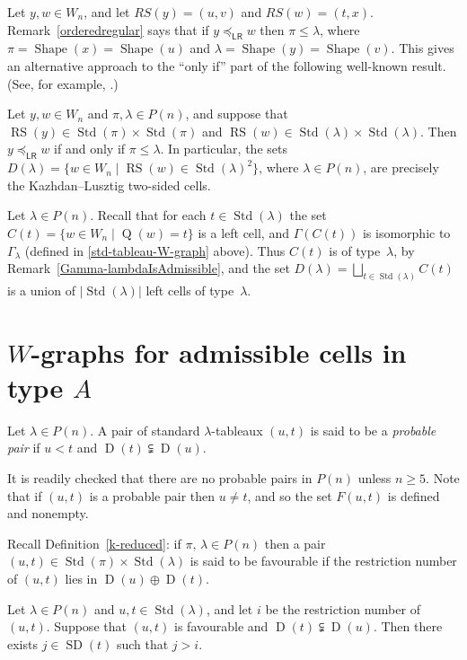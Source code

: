 \documentclass[ALCO,ThmDefs,Unicode,epreuves]{cedram}
\newcommand{\leftright}{_{\mathsf{LR}}}
\DeclareMathOperator{\STD}{Std}
\DeclareMathOperator{\shape}{Shape}
\DeclareMathOperator{\SD}{SD}
\DeclareMathOperator{\D}{D}
\DeclareMathOperator{\RS}{RS}
\DeclareMathOperator{\RSQ}{Q}
\begin{document}
\begin{rema}\label{orderedtwosided}
Let $y,w \in W_n$, and let $RS(y)=(u,v)$ and $RS(w)=(t,x)$. Remark~\ref{orderedregular}
says that if $y\preceq\leftright w$ then
$\pi\leqslant\lambda$, where $\pi=\shape(x)=\shape(u)$ and
$\lambda=\shape(y)=\shape(v)$. This gives an alternative approach to
the ``only if'' part of the following well-known result. (See, for example,
\cite[Theorem~5.1]{geck:klMurphy}.)
\begin{theo}\label{Wn-two-sidedcell}
Let $y,w\in W_n$ and $\pi,\lambda\in P(n)$, and suppose that $\RS(y)\in\STD(\pi)\times\STD(\pi)$ and
$\RS(w)\in\STD(\lambda)\times\STD(\lambda)$. Then
$y\preceq\leftright w$ if and only if $\pi\leqslant\lambda$. In particular,
the sets $D(\lambda)=\{w\in W_n \mid \RS(w)\in\STD(\lambda)^2\}$, where
$\lambda\in P(n)$, are precisely the Kazhdan--Lusztig two-sided cells.
\end{theo}
Let $\lambda\in P(n)$. Recall that for each $t\in\STD(\lambda)$ the set
$C(t)=\{w\in W_n\mid \RSQ(w)=t\}$ is a left cell, and $\Gamma(C(t))$ is
isomorphic to $\Gamma_{\lambda}$ (defined in \ref{std-tableau-W-graph} above).
Thus $C(t)$ is of type~$\lambda$, by Remark~\ref{Gamma-lambdaIsAdmissible},
and the set $D(\lambda)=\bigsqcup_{t\in\STD(\lambda)}C(t)$
is a union of $\lvert \STD(\lambda) \rvert$
left cells of type~$\lambda$.
\end{rema}

\section{\texorpdfstring{$W$}{W}-graphs for admissible cells in type \texorpdfstring{$A$}{A}}
\label{sec:9}

\begin{defi}\label{probablepair}
Let $\lambda\in P(n)$. A pair of standard $\lambda$-tableaux $(u,t)$ is said to
be a \emph{probable pair} if $u<t$ and $\D(t)\subsetneqq\D(u)$.
\end{defi}
It is readily checked that there are no probable pairs in $P(n)$ unless $n\geqslant 5$.
Note that if $(u,t)$ is a probable pair then $u\ne t$, and so the set
$F(u,t)$ is defined and nonempty.

Recall Definition~\ref{k-reduced}: if $\pi,\,\lambda\in P(n)$ then a pair
$(u,t)\in\STD(\pi)\times\STD(\lambda)$ is said to be favourable if the restriction number
of $(u,t)$ lies in $\D(u)\oplus\D(t)$.
\begin{lemm}\label{rnltmaxsd}
Let $\lambda\in P(n)$ and $u,t\in\STD(\lambda)$, and let $i$ be the
restriction number of~$(u,t)$. Suppose that $(u,t)$ is favourable and
$\D(t)\subsetneqq\D(u)$. Then there exists $j\in \SD(t)$ such that $j>i$.
\end{lemm}
\end{document}
